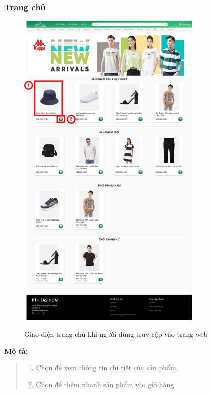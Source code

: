     \subsubsection{Trang chủ}
    \begin{figure}[!htp]
        \centering
        \includegraphics[width=3.5in]{img/UI/new_customer/home.png}
        \label{8}
        \newline
        \caption{Giao diện trang chủ khi người dùng truy cập vào trang web}
    \end{figure}
    \textbf{Mô tả:}  
    \begin{quote}
        \begin{enumerate}
            \item Chọn để xem thông tin chi tiết của sản phẩm.
            \item Chọn để thêm nhanh sản phẩm vào giỏ hàng.
        \end{enumerate}
    \end{quote}    
   
